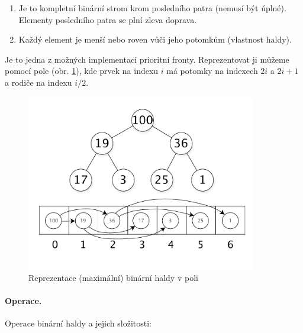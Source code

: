 \begin{enumerate}[itemsep=0pt, topsep=2pt]
    \item Je to kompletní binární strom krom posledního patra (nemusí být úplné). Elementy posledního patra se plní zleva doprava.
    \item Každý element je menší nebo roven vůči jeho potomkům (vlastnost haldy).
\end{enumerate}

\noindent Je to jedna z možných implementací prioritní fronty. Reprezentovat ji můžeme pomocí pole (obr. \ref{fig:heap_array_representation}), kde prvek na indexu $i$ má potomky na indexech $2i$ a $2i + 1$ a rodiče na indexu $i/2$.

\begin{figure}[htbp]
    \begin{center}
        \vspace{-20px}
        \includegraphics[width=100mm]{01/images/Max-Heap}
        \vspace{-20px}
        \caption{Reprezentace (maximální) binární haldy v poli}
        \label{fig:heap_array_representation}
        \vspace{-20px}
    \end{center}
\end{figure}

\paragraph{Operace.} Operace binární haldy a jejich složitosti:

